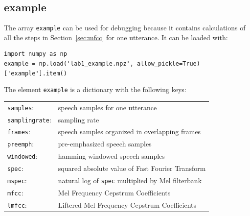 \documentclass{nada-ten}
\begin{document}
\subsection{example}
The array \texttt{example} can be used for debugging because it contains calculations of all the steps in Section~\ref{sec:mfcc} for one utterance. It can be loaded with:
\begin{verbatim}
import numpy as np
example = np.load('lab1_example.npz', allow_pickle=True)['example'].item()
\end{verbatim}

The element \texttt{example} is a dictionary with the following keys:

\vspace{2mm}
\begin{tabular}{ll}
  \texttt{samples}: & speech samples for one utterance \\
  \texttt{samplingrate}: & sampling rate \\
  \texttt{frames}: & speech samples organized in overlapping frames \\
  \texttt{preemph}: & pre-emphasized speech samples \\
  \texttt{windowed}: & hamming windowed speech samples \\
  \texttt{spec}: & squared absolute value of Fast Fourier Transform \\
  \texttt{mspec}:   & natural log of \texttt{spec} multiplied by Mel filterbank \\
  \texttt{mfcc}:    & Mel Frequency Cepstrum Coefficients \\
  \texttt{lmfcc}:   & Liftered Mel Frequency Cepstrum Coefficients
\end{tabular}
\vspace{2mm}
\end{document}
